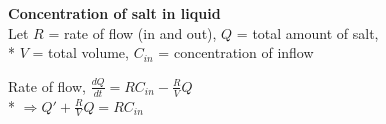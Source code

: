 \documentclass[10pt, landscape]{article}
\newenvironment{tightcenter}{%
  \setlength\topsep{0pt}
  \setlength\parskip{0pt}
  \begin{center}
}{%
  \end{center}
}
\let\Then\Rightarrow
\begin{document}
\begin{multicols*}{4}
\textbf{Concentration of salt in liquid}
\\ Let $R$ = rate of flow (in and out), $Q$ = total amount of salt, 
    \\* $V$ = total volume, $C_{in}$ = concentration of inflow
\begin{tightcenter}
    Rate of flow, $\frac{dQ}{dt} = RC_{in} - \frac{R}{V}Q$
    \\* $\Then Q' + \frac{R}{V}Q = RC_{in}$
\end{tightcenter}

\end{multicols*}
\end{document}
